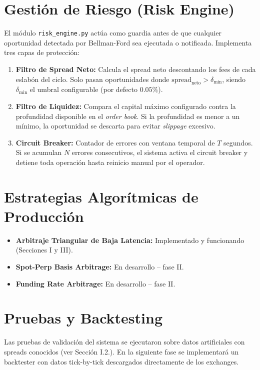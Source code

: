 \documentclass[11pt,a4paper]{article}
\begin{document}
\section{Gesti\'on de Riesgo (Risk Engine)}

El m\'odulo \texttt{risk\_engine.py} act\'ua como guardia antes de que cualquier oportunidad detectada por Bellman-Ford sea ejecutada o notificada. Implementa tres capas de protecci\'on:

\begin{enumerate}
    \item \textbf{Filtro de Spread Neto:} Calcula el spread neto descontando los fees de cada eslab\'on del ciclo. Solo pasan oportunidades donde $\text{spread}_{\text{neto}} > \delta_{\min}$, siendo $\delta_{\min}$ el umbral configurable (por defecto $0.05\%$).
    \item \textbf{Filtro de Liquidez:} Compara el capital m\'aximo configurado contra la profundidad disponible en el \textit{order book}. Si la profundidad es menor a un m\'inimo, la oportunidad se descarta para evitar \textit{slippage} excesivo.
    \item \textbf{Circuit Breaker:} Contador de errores con ventana temporal de $T$ segundos. Si se acumulan $N$ errores consecutivos, el sistema activa el circuit breaker y detiene toda operaci\'on hasta reinicio manual por el operador.
\end{enumerate}

\section{Estrategias Algor\'itmicas de Producci\'on}

\begin{itemize}
    \item \textbf{Arbitraje Triangular de Baja Latencia:} Implementado y funcionando (Secciones I y III).
    \item \textbf{Spot-Perp Basis Arbitrage:} En desarrollo -- fase II.
    \item \textbf{Funding Rate Arbitrage:} En desarrollo -- fase II.
\end{itemize}

\section{Pruebas y Backtesting}

Las pruebas de validaci\'on del sistema se ejecutaron sobre datos artificiales con spreads conocidos (ver Secci\'on I.2.). En la siguiente fase se implementar\'a un backtester con datos tick-by-tick descargados directamente de los exchanges.
\end{document}

